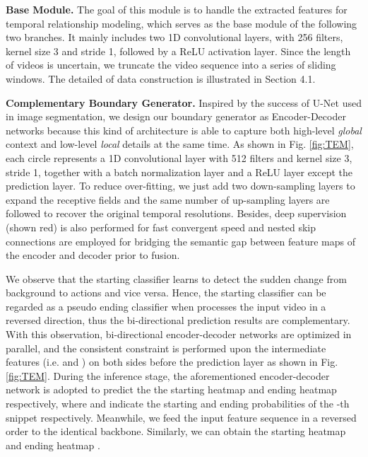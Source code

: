 \documentclass[letterpaper]{article} \usepackage{aaai21}  \usepackage{times}  \usepackage{helvet} \usepackage{courier}  \usepackage[hyphens]{url}  \usepackage{graphicx} \urlstyle{rm} \def\UrlFont{\rm}  \usepackage{natbib}  \usepackage{amsmath,amssymb} \usepackage{caption} \frenchspacing  \usepackage{color}
\begin{document}
\noindent
\textbf{Base Module.} The goal of this module is to handle the extracted features for temporal relationship modeling, which serves as the base module of the following two branches. It mainly includes two 1D convolutional layers, with 256 filters, kernel size 3 and stride 1, followed by a ReLU activation layer. Since the length of videos is uncertain, we truncate the video sequence into a series of sliding windows. The detailed of data construction is illustrated in Section 4.1.

\noindent
\textbf{Complementary Boundary Generator.}  Inspired by the success of U-Net \cite{unet,Unet++} used in image segmentation, we design our boundary generator as Encoder-Decoder networks because this kind of architecture is able to capture both high-level \textit{global} context and low-level \textit{local} details at the same time. As shown in Fig. \ref{fig:TEM}, each circle represents a 1D convolutional layer with 512 filters and kernel size 3, stride 1, together with a batch normalization layer and a ReLU layer except the prediction layer. To reduce over-fitting, we just add two down-sampling layers to expand the receptive fields and the same number of up-sampling layers are followed to recover the original temporal resolutions. Besides, deep supervision (shown {\color{red}red}) is also performed for fast convergent speed and nested skip connections are employed for bridging the semantic gap between feature maps of the encoder and decoder prior to fusion.



We observe that the starting classifier learns to detect the sudden change from background to actions and vice versa. Hence, the starting classifier can be regarded as a pseudo ending classifier when processes the input video in a reversed direction, thus the bi-directional prediction results are complementary. With this observation, bi-directional encoder-decoder networks are optimized in parallel, and the consistent constraint is performed upon the intermediate features (i.e.  and  ) on both sides before the prediction layer as shown in Fig. \ref{fig:TEM}. During the inference stage, the aforementioned encoder-decoder network is adopted to predict the 
the starting heatmap  and ending heatmap  respectively,  where  and  indicate the starting and ending probabilities of the -th snippet respectively. Meanwhile, we feed the input feature sequence in a reversed order to the identical backbone. Similarly, we can obtain the starting heatmap  and ending heatmap . 
\end{document}
